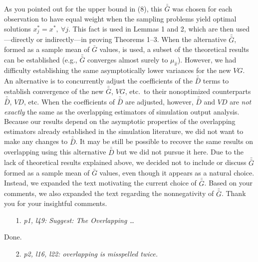 \documentclass[11pt,notitlepage,onecolumn]{article}
\newcommand{\noi}{\noindent}
\newcommand{\gb}{\bar{G}}
\newcommand{\gbb}{\bar{\gb}}
\newcommand{\db}{\bar{D}}
\newcommand{\dbb}{\bar{\db}}
\begin{document}
\noi 
As you pointed out for the upper bound in (8), this $\gbb$ was chosen for each observation to have equal weight when the sampling problems yield optimal solutions $x_j^* = x^*, \ \forall j$. 
This fact is used in Lemmas 1 and 2, which are then used---directly or indirectly---in proving Theorems 1--3. 
When the alternative $\gbb$, formed as a sample mean of $\gb$ values, is used, 
a subset of the theoretical results can be established (e.g., $\gbb$ converges almost surely to $\mu_{\hat{x}}$). 
However, we had difficulty establishing the same asymptotically lower variances for the new $VG$. 
An alternative is to concurrently adjust the coefficients of the $\dbb$ terms to establish convergence of the new $\gbb$, $VG$, etc.\ to their nonoptimized counterparts $\dbb$, $VD$, etc.
When the coefficients of $\dbb$ are adjusted, however, $\dbb$ and $VD$ are {\it not exactly} the same as the overlapping estimators of simulation output analysis. 
Because our results depend on the asymptotic properties of the overlapping estimators already established in the simulation literature, we did not want to make any changes to $\dbb$. 
It may be still be possible to recover the same results on overlapping using this alternative  $\dbb$ but we did not pursue it here. 
Due to the lack of theoretical results explained above, we decided not to include or discuss $\gbb$ formed as a sample mean of $\gb$ values, even though it appears as a natural choice. 
Instead, we expanded the text motivating the current choice of $\gbb$. 
Based on your comments, we also expanded the text regarding the nonnegativity of $\gbb$. 
Thank you for your insightful comments. 
\medskip 

\bigskip 

\noi {\large \bf Minor comments:}

\bigskip



\begin{itemize}
\item[1.] \textit{p1, l49: Suggest: The Overlapping \ldots }
\end{itemize}

\noindent 
Done. 
\medskip 

\begin{itemize}
\item[2.] \textit{p2, l16, l22: overlapping is misspelled twice.}
\end{itemize}
\end{document}
